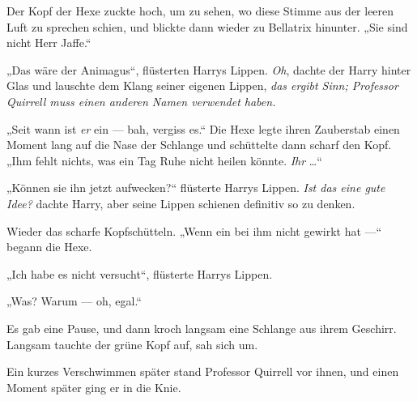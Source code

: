 Der Kopf der Hexe zuckte hoch, um zu sehen, wo diese Stimme aus der leeren Luft zu sprechen schien, und blickte dann wieder zu Bellatrix hinunter.
„Sie sind nicht Herr Jaffe.“

„Das wäre der Animagus“, flüsterten Harrys Lippen. \emph{Oh}, dachte der Harry hinter Glas und lauschte dem Klang seiner eigenen Lippen, \emph{das ergibt Sinn; Professor Quirrell muss einen anderen Namen verwendet haben.}

„Seit wann ist \emph{er} ein — bah, vergiss es.“ Die Hexe legte ihren Zauberstab einen Moment lang auf die Nase der Schlange und schüttelte dann scharf den Kopf.
„Ihm fehlt nichts, was ein Tag Ruhe nicht heilen könnte. \emph{Ihr} …“

„Können sie ihn jetzt aufwecken?“ flüsterte Harrys Lippen. \emph{Ist das eine gute Idee?} dachte Harry, aber seine Lippen schienen definitiv so zu denken.

Wieder das scharfe Kopfschütteln.
„Wenn ein  bei ihm nicht gewirkt hat —“ begann die Hexe.

„Ich habe es nicht versucht“, flüsterte Harrys Lippen.

„Was? Warum — oh, egal.“ 

Es gab eine Pause, und dann kroch langsam eine Schlange aus ihrem Geschirr. Langsam tauchte der grüne Kopf auf, sah sich um.

Ein kurzes Verschwimmen später stand Professor Quirrell vor ihnen, und einen Moment später ging er in die Knie.

